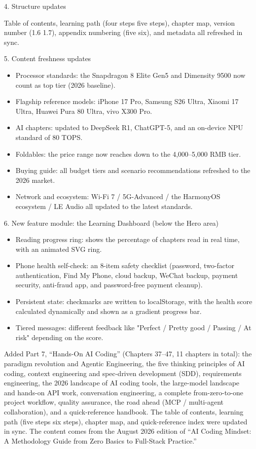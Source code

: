 4. Structure updates

Table of contents, learning path (four steps five steps), chapter map, version number (1.6 1.7), appendix numbering (five six), and metadata all refreshed in sync.

5. Content freshness updates

\begin{itemize}
  \item Processor standards: the Snapdragon 8 Elite Gen5 and Dimensity 9500 now count as top tier (2026 baseline).
  \item Flagship reference models: iPhone 17 Pro, Samsung S26 Ultra, Xiaomi 17 Ultra, Huawei Pura 80 Ultra, vivo X300 Pro.
  \item AI chapters: updated to DeepSeek R1, ChatGPT-5, and an on-device NPU standard of 80 TOPS.
  \item Foldables: the price range now reaches down to the 4,000–5,000 RMB tier.
  \item Buying guide: all budget tiers and scenario recommendations refreshed to the 2026 market.
  \item Network and ecosystem: Wi-Fi 7 / 5G-Advanced / the HarmonyOS ecosystem / LE Audio all updated to the latest standards.
\end{itemize}

6. New feature module: the Learning Dashboard (below the Hero area)

\begin{itemize}
  \item Reading progress ring: shows the percentage of chapters read in real time, with an animated SVG ring.
  \item Phone health self-check: an 8-item safety checklist (password, two-factor authentication, Find My Phone, cloud backup, WeChat backup, payment security, anti-fraud app, and password-free payment cleanup).
  \item Persistent state: checkmarks are written to localStorage, with the health score calculated dynamically and shown as a gradient progress bar.
  \item Tiered messages: different feedback like "Perfect / Pretty good / Passing / At risk" depending on the score.
\end{itemize}


Added Part 7, “Hands-On AI Coding” (Chapters 37–47, 11 chapters in total): the paradigm revolution and Agentic Engineering, the five thinking principles of AI coding, context engineering and spec-driven development (SDD), requirements engineering, the 2026 landscape of AI coding tools, the large-model landscape and hands-on API work, conversation engineering, a complete from-zero-to-one project workflow, quality assurance, the road ahead (MCP / multi-agent collaboration), and a quick-reference handbook. The table of contents, learning path (five steps six steps), chapter map, and quick-reference index were updated in sync. The content comes from the August 2026 edition of “AI Coding Mindset: A Methodology Guide from Zero Basics to Full-Stack Practice.”


